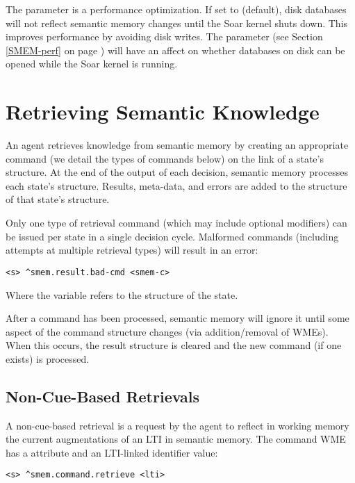 The  parameter is a performance optimization.
If set to  (default), disk databases will not reflect semantic memory changes until the Soar kernel shuts down.
This improves performance by avoiding disk writes.
The  parameter (see Section \ref{SMEM-perf} on page \pageref{SMEM-perf}) will have an affect on whether databases on disk can be opened while the Soar kernel is running.


\section{Retrieving Semantic Knowledge}
\label{SMEM-retrieve}

An agent retrieves knowledge from semantic memory by creating an appropriate command (we detail the types of commands below) on the  link of a state's  structure.
At the end of the output of each decision, semantic memory processes each state's  structure.
Results, meta-data, and errors are added to the  structure of that state's  structure.

Only one type of retrieval command (which may include optional modifiers) can be issued per state in a single decision cycle.
Malformed commands (including attempts at multiple retrieval types) will result in an error:

\begin{verbatim}
<s> ^smem.result.bad-cmd <smem-c>
\end{verbatim}

Where the  variable refers to the  structure of the state.

After a command has been processed, semantic memory will ignore it until some aspect of the command structure changes (via addition/removal of WMEs).
When this occurs, the result structure is cleared and the new command (if one exists) is processed.

\subsection{Non-Cue-Based Retrievals}
A non-cue-based retrieval is a request by the agent to reflect in working memory the current augmentations of an LTI in semantic memory.
The command WME has a  attribute and an LTI-linked identifier value:

\begin{verbatim}
<s> ^smem.command.retrieve <lti>
\end{verbatim}

